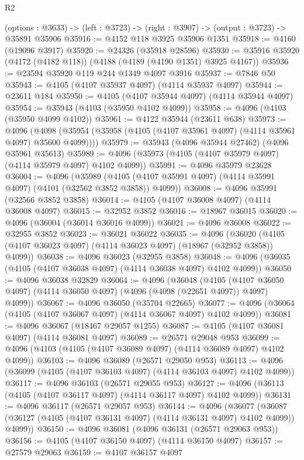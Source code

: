 \begin{lexlean}{R2}
\begin{coremodule}
  (options : @3633) -> (left : @3723) -> (right : @3907) -> (output : @3723) -> @35891 @35906
@35916 := @4152 @118 @3925 @35906 @1351
@35918 := @4160 (@19096 @3917)
@35920 := @24326 (@35918 @28596)
@35930 := @35916 @35920 (@4172 (@4182 @118)) (@4188 (@4189 (@4190 @1351) @3925 @4167))
@35936 := @23594 @35920 @119 @244 @1349 @4097 @3916
@35937 := @7846 @50
@35943 := @4105 (@4107 @35937 @4097) (@4114 @35937 @4097)
@35944 := @23611 @184
@35950 := @4105 (@4107 @35944 @4097) (@4114 @35944 @4097)
@35954 := @35943 (@4103 (@35950 @4102 @4099))
@35958 := @4096 (@4103 (@35950 @4099 @4102))
@35961 := @4122 @35944 (@23611 @638)
@35973 := @4096
    (@4098 (@35954 (@35958 (@4105 (@4107 @35961 @4097) (@4114 @35961 @4097) @35600 @4099))))
@35979 := @35943 (@4096 @35944 @27462) (@4096 @35961 @35613)
@35989 := @4096 (@35973 (@4105 (@4107 @35979 @4097) (@4114 @35979 @4097) @4102 @4099))
@35991 := @4096 @35979 @23628
@36004 := @4096
    (@35989 (@4105 (@4107 @35991 @4097) (@4114 @35991 @4097) (@4101 (@32562 @3852 @3858)) @4099))
@36008 := @4096 @35991 (@32566 @3852 @3858)
@36014 := @4105 (@4107 @36008 @4097) (@4114 @36008 @4097)
@36015 := @32952 @3852
@36016 := @18967 @36015
@36020 := @4096 (@36004 (@36014 @36016 @4099))
@36021 := @4096 @36008
@36022 := @32955 @3852
@36023 := @36021 @36022
@36035 := @4096
    (@36020 (@4105 (@4107 @36023 @4097) (@4114 @36023 @4097) (@18967 (@32952 @3858)) @4099))
@36038 := @4096 @36023 (@32955 @3858)
@36048 := @4096 (@36035 (@4105 (@4107 @36038 @4097) (@4114 @36038 @4097) @4102 @4099))
@36050 := @4096 @36038 @32829
@36064 := @4096
    (@36048
      (@4105 (@4107 @36050 @4097) (@4114 @36050 @4097) (@4096 (@4098 (@22651 @4097)) @4097) @4099))
@36067 := @4096 @36050 (@35704 @22665)
@36077 := @4096 (@36064 (@4105 (@4107 @36067 @4097) (@4114 @36067 @4097) @4102 @4099))
@36081 := @4096 @36067 (@18467 @29057 @1255)
@36087 := @4105 (@4107 @36081 @4097) (@4114 @36081 @4097)
@36089 := @26571 @29048 @953
@36099 := @4096 (@4103 (@4105 (@4107 @36089 @4097) (@4114 @36089 @4097) @4102 @4099))
@36103 := @4096 @36089 (@26571 @29050 @953)
@36113 := @4096 (@36099 (@4105 (@4107 @36103 @4097) (@4114 @36103 @4097) @4102 @4099))
@36117 := @4096 @36103 (@26571 @29055 @953)
@36127 := @4096 (@36113 (@4105 (@4107 @36117 @4097) (@4114 @36117 @4097) @4102 @4099))
@36131 := @4096 @36117 (@26571 @29057 @953)
@36144 := @4096
    (@36077 (@36087 (@36127 (@4105 (@4107 @36131 @4097) (@4114 @36131 @4097) @4102 @4099)) @4099))
@36150 := @4096 @36081 (@4096 @36131 (@26571 @29063 @953))
@36156 := @4105 (@4107 @36150 @4097) (@4114 @36150 @4097)
@36157 := @27579 @29063
@36159 := @4107 @36157 @4097

\end{coremodule}
\end{lexlean}

